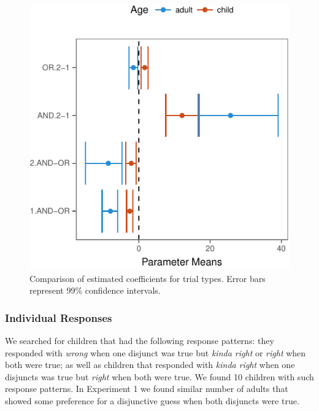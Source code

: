 \documentclass[10pt, letterpaper]{article}
\newenvironment{CodeChunk}{}{}
\begin{document}
\begin{CodeChunk}
\begin{figure}[t]

{\centering \includegraphics{figs/model-plot-1} 

}

\caption[Comparison of estimated coefficients for trial types]{Comparison of estimated coefficients for trial types. Error bars represent 99\% confidence intervals.}\label{fig:model-plot}
\end{figure}
\end{CodeChunk}

\subsubsection{Individual Responses}\label{individual-responses-1}

We searched for children that had the following response patterns: they
responded with \emph{wrong} when one disjunct was true but \emph{kinda
right} or \emph{right} when both were true; as well as children that
responded with \emph{kinda right} when one disjuncts was true but
\emph{right} when both were true. We found 10 children with such
response patterns. In Experiment 1 we found similar number of adults
that showed some preference for a disjunctive guess when both disjuncts
were true.
\end{document}
